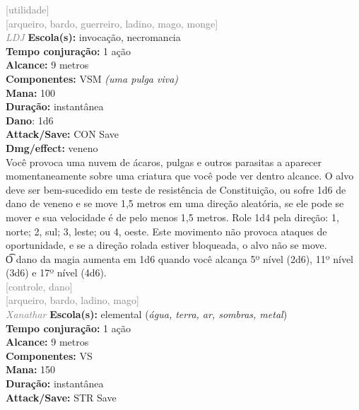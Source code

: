 \documentclass{RPG_Adventure}[2021/10/20]
\begin{document}
{\scriptsize \textcolor{gray}{[utilidade]\\}}
{\scriptsize \textcolor{gray}{[arqueiro, bardo, guerreiro, ladino, mago, monge]\\}}
{\tiny \textcolor{gray}{\textit{LDJ}}}
{\small \t \textbf{Escola(s):} invocação, necromancia\\\t \textbf{Tempo conjuração:} 1 ação\\\t \textbf{Alcance:} 9 metros\\\t \textbf{Componentes:} VSM \textit{(uma pulga viva)}\\\t \textbf{Mana:} 100\\\t \textbf{Duração:} instantânea\\\t \textbf{Dano}: 1d6\\\t \textbf{Attack/Save:} CON Save\\\t \textbf{Dmg/effect:} veneno\\}
{\normalsize Você provoca uma nuvem de ácaros, pulgas e outros parasitas a aparecer momentaneamente sobre uma criatura que você pode ver dentro alcance. O alvo deve ser bem-sucedido em teste de resistência de  Constituição, ou sofre 1d6 de dano de veneno e se move 1,5 metros em uma direção aleatória, se ele pode se mover e sua velocidade é de pelo menos 1,5 metros. Role 1d4 pela direção: 1, norte; 2, sul; 3, leste; ou 4, oeste. Este movimento não provoca ataques de oportunidade, e se a direção rolada estiver bloqueada, o alvo não se move.\\\t O dano da magia aumenta em 1d6 quando você alcança 5º nível (2d6), 11º nível (3d6) e 17º nível (4d6).\\}
{\scriptsize \textcolor{gray}{[controle, dano]\\}}
{\scriptsize \textcolor{gray}{[arqueiro, bardo, ladino, mago]\\}}
{\tiny \textcolor{gray}{\textit{Xanathar}}}
{\small \t \textbf{Escola(s):} elemental (\textit{água, terra, ar, sombras, metal})\\\t \textbf{Tempo conjuração:} 1 ação\\\t \textbf{Alcance:} 9 metros\\\t \textbf{Componentes:} VS\\\t \textbf{Mana:} 150\\\t \textbf{Duração:} instantânea\\\t \textbf{Attack/Save:} STR Save\\}
\end{document}
